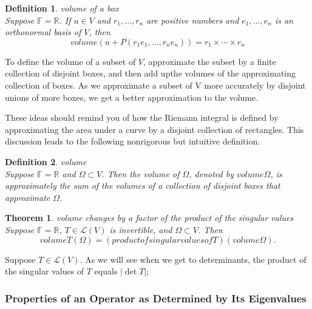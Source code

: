 \documentclass{article}
\newtheorem{theorem}{Theorem}[subsection]
\newtheorem{definition}{Definition}[subsection]
\newcommand{\RR}{\mathbb{R}}
\newcommand{\FF}{\mathbb{F}}
\begin{document}
\begin{CJK}{UTF8}{gkai}
\begin{definition}
    volume of a box\\

    Suppose $\FF = \RR$. If $u \in V$ and $r_1,\ldots,r_n$ are positive numbers and $e_1,\ldots,e_n$ is an orthonormal basis of $V$, then
    \[volume(u + P(r_1e_1,\ldots,r_n e_n)) = r_1 \times \cdots \times r_n\]
\end{definition}

To define the volume of a subset of $V$, approximate the subset by a finite collection of disjoint boxes, and then add upthe volumes of the approximating collection of boxes. As we approximate a subset of V more accurately by disjoint unions of more boxes, we get a better approximation to the volume.

These ideas should remind you of how the Riemann integral is defined by approximating the area under a curve by a disjoint collection of rectangles. This discussion leads to the following nonrigorous but intuitive definition.

\begin{definition}
    volume\\

    Suppose $\FF = \RR$ and $\Omega \subset V$. Then the volume of $\Omega$, denoted by $volume\Omega$, is approximately the sum of the volumes of a collection of disjoint boxes that approximate $\Omega$.
\end{definition}

\begin{theorem}
    volume changes by a factor of the product of the singular values\\

    Suppose $\FF = \RR$, $T \in \mathcal{L}(V)$ is invertible, and $\Omega \subset V$. Then
    \[volumeT(\Omega) = (product of singular values of T)(volume\Omega).\]
\end{theorem}

Suppose $T \in \mathcal{L}(V)$. As we will see when we get to determinants, the product of the singular values of $T$ equals $|\det T|$;

\subsubsection{Properties of an Operator as Determined by Its Eigenvalues}
\begin{center}
    

\end{center}
\end{CJK}
\end{document}
